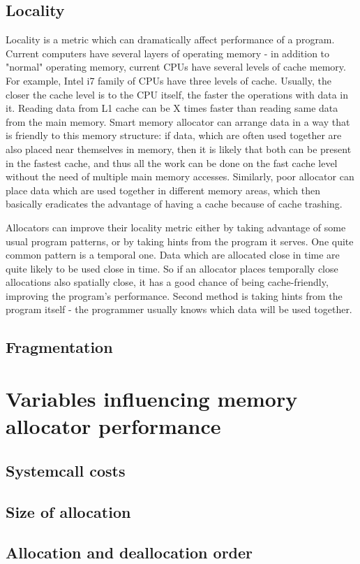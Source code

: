 \subsection{Locality}
Locality is a metric which can dramatically affect performance of a program. Current computers have several layers of operating memory - in addition to "normal" operating memory, current CPUs have several levels of cache memory. For example, Intel i7 family of CPUs have three levels of cache. Usually, the closer the cache level is to the CPU itself, the faster the operations with data in it. Reading data from L1 cache can be X times faster than reading same data from the main memory. Smart memory allocator can arrange data in a way that is friendly to this memory structure: if data, which are often used together are also placed near themselves in memory, then it is likely that both can be present in the fastest cache, and thus all the work can be done on the fast cache level without the need of multiple main memory accesses. Similarly, poor allocator can place data which are used together in different memory areas, which then basically eradicates the advantage of having a cache because of cache trashing. 

Allocators can improve their locality metric either by taking advantage of some usual program patterns, or by taking hints from the program it serves. One quite common pattern is a temporal one. Data which are allocated close in time are quite likely to be used close in time. So if an allocator places temporally close allocations also spatially close, it has a good chance of being cache-friendly, improving the program's performance. Second method is taking hints from the program itself - the programmer usually knows which data will be used together. 
\subsection{Fragmentation}
\section{Variables influencing memory allocator performance}
\subsection{Systemcall costs}
\subsection{Size of allocation}
\subsection{Allocation and deallocation order}
